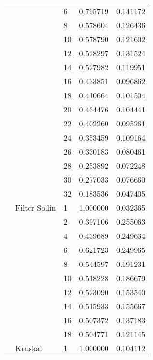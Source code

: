 \begin{tabular}{lllrr}
                      &            & 6  &  0.795719 &  0.141172 \\
                      &            & 8  &  0.578604 &  0.126436 \\
                      &            & 10 &  0.578790 &  0.121602 \\
                      &            & 12 &  0.528297 &  0.131524 \\
                      &            & 14 &  0.527982 &  0.119951 \\
                      &            & 16 &  0.433851 &  0.096862 \\
                      &            & 18 &  0.410664 &  0.101504 \\
                      &            & 20 &  0.434476 &  0.104441 \\
                      &            & 22 &  0.402260 &  0.095261 \\
                      &            & 24 &  0.353459 &  0.109164 \\
                      &            & 26 &  0.330183 &  0.080461 \\
                      &            & 28 &  0.253892 &  0.072248 \\
                      &            & 30 &  0.277033 &  0.076660 \\
                      &            & 32 &  0.183536 &  0.047405 \\
                      & Filter Sollin & 1  &  1.000000 &  0.032365 \\
                      &            & 2  &  0.397106 &  0.255063 \\
                      &            & 4  &  0.439689 &  0.249634 \\
                      &            & 6  &  0.621723 &  0.249965 \\
                      &            & 8  &  0.544597 &  0.191231 \\
                      &            & 10 &  0.518228 &  0.186679 \\
                      &            & 12 &  0.523090 &  0.153540 \\
                      &            & 14 &  0.515933 &  0.155667 \\
                      &            & 16 &  0.507372 &  0.137183 \\
                      &            & 18 &  0.504771 &  0.121145 \\
                      & Kruskal & 1  &  1.000000 &  0.104112 \\

\end{tabular}
